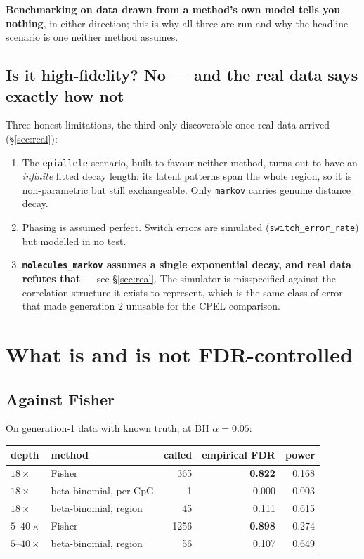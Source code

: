\documentclass[11pt]{article}
\begin{document}
\textbf{Benchmarking on data drawn from a method's own model tells you nothing},
in either direction; this is why all three are run and why the headline scenario
is one neither method assumes.

\subsection{Is it high-fidelity? No --- and the real data says exactly how not}

Three honest limitations, the third only discoverable once real data arrived
(\S\ref{sec:real}):

\begin{enumerate}
\item The \texttt{epiallele} scenario, built to favour neither method, turns out
to have an \emph{infinite} fitted decay length: its latent patterns span the
whole region, so it is non-parametric but still exchangeable. Only
\texttt{markov} carries genuine distance decay.
\item Phasing is assumed perfect. Switch errors are simulated
(\texttt{switch\_error\_rate}) but modelled in no test.
\item \textbf{\texttt{molecules\_markov} assumes a single exponential decay, and
real data refutes that} --- see \S\ref{sec:real}. The simulator is misspecified
against the correlation structure it exists to represent, which is the same class
of error that made generation 2 unusable for the CPEL comparison.
\end{enumerate}

\section{What is and is not FDR-controlled}
\label{sec:bench}

\subsection{Against Fisher}

On generation-1 data with known truth, at BH $\alpha = 0.05$:

\begin{center}
\small
\begin{tabular}{llrrr}
\toprule
depth & method & called & empirical FDR & power \\
\midrule
$18\times$ & Fisher & 365 & \textbf{0.822} & 0.168 \\
$18\times$ & beta-binomial, per-CpG & 1 & 0.000 & 0.003 \\
$18\times$ & beta-binomial, region & 45 & 0.111 & 0.615 \\
$5$--$40\times$ & Fisher & 1256 & \textbf{0.898} & 0.274 \\
$5$--$40\times$ & beta-binomial, region & 56 & 0.107 & 0.649 \\
\bottomrule
\end{tabular}
\end{center}
\end{document}
